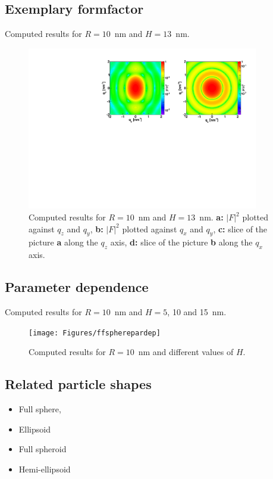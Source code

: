 \subsection{Exemplary formfactor}
Computed results for $R=10$~nm and $H=13$~nm.
\begin{figure}[h]
\begin{center}
\includegraphics[width=0.9\textwidth]{Figures/figffsphere}
\end{center}
\caption{Computed results for $R=10$~nm and $H=13$~nm. {\bf a:} $|F|^2$ plotted against $q_z$ and $q_y$, {\bf b:} $|F|^2$ plotted against $q_x$ and $q_y$, {\bf c:} slice of the picture {\bf a} along the $q_z$ axis, {\bf d:} slice of the picture {\bf b} along the $q_x$ axis.}
\end{figure}

\par

\subsection{Parameter dependence}
Computed results for $R=10$~nm and $H=5$, 10 and 15~nm.
\begin{figure}[h]
\begin{center}
\texttt{[image: Figures/ffspherepardep]}
\end{center}
\caption{Computed results for $R=10$~nm and different values of $H$.}
\end{figure}


\subsection{Related particle shapes}
\begin{itemize}
\item Full sphere, 
\item Ellipsoid
\item Full spheroid
\item Hemi-ellipsoid
\end{itemize} 

